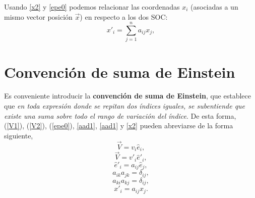 Usando \eqref{x2} y \eqref{epe0} podemos relacionar las coordenadas $x_i$ (asociadas a un mismo vector posición $\vec{x}$) en respecto a los dos SOC:
\begin{equation}
\boxed{x'_i=\sum_{j=1}^na_{ij}x_j,} \label{xpax0}
\end{equation}


\section{Convención de suma de Einstein}

Es conveniente introducir la \textbf{convención de suma de Einstein}, que establece que \textit{en toda expresión donde se repitan dos índices iguales, se subentiende que existe una suma sobre todo el rango de variación del índice}.  De esta forma, (\ref{V1}), (\ref{V2}),  (\ref{epe0}), \eqref{aad1}, \eqref{aad1} y \eqref{x2} pueden abreviarse de la forma siguiente,
\begin{equation}\label{V1b}
\vec{V}=v_i\hat{e}_i,
\end{equation}
\begin{equation}\label{V2b}
\vec{V}=v'_i\hat{e}'_i,
\end{equation}
\begin{equation}\label{epe}
\hat{e}'_i= a_{ij}\hat{e}_j,
\end{equation}
\begin{equation}\label{aatdel}
a_{ik}a_{jk}=\delta_{ij},
\end{equation}
\begin{equation}
a_{ki}a_{kj}=\delta_{ij},
\end{equation}
\begin{equation}\label{xpax}
x'_i=a_{ij}x_j.
\end{equation}

